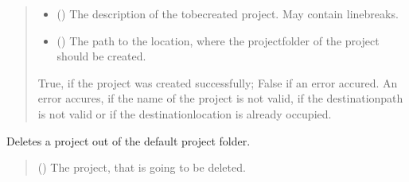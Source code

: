 \documentclass[letterpaper,10pt,english]{sphinxmanual}
\begin{document}
\begin{fulllineitems}
\begin{fulllineitems}
\begin{quote}
\begin{description}
\begin{itemize}
\item {} 
\sphinxAtStartPar
{} () \textendash{} The description of the to\sphinxhyphen{}be\sphinxhyphen{}created project. May contain line\sphinxhyphen{}breaks.

\item {} 
\sphinxAtStartPar
{} () \textendash{} The path to the location, where the projectfolder of the project should be created.

\end{itemize}

\sphinxAtStartPar
True, if the project was created successfully; False if an error accured. An error accures, if the name of the project is not valid, if the destination\sphinxhyphen{}path is not valid or if the destination\sphinxhyphen{}location is already occupied.

\sphinxAtStartPar
{}

\end{description}\end{quote}

\end{fulllineitems}


\begin{fulllineitems}
\label{\detokenize{apidoc/src.osm_configurator.control:src.osm_configurator.control.control_interface.IControl.delete_passive_project}}
\pysigstartsignatures
{}
\pysigstopsignatures
\sphinxAtStartPar
Deletes a project out of the default project folder.
\begin{quote}\begin{description}
\sphinxAtStartPar
{} ({\hyperref[\detokenize{apidoc/src.osm_configurator.model.application:src.osm_configurator.model.application.passive_project.PassiveProject}]{}}) \textendash{} The project, that is going to be deleted.


\end{description}
\end{quote}
\end{fulllineitems}
\end{fulllineitems}
\end{document}
